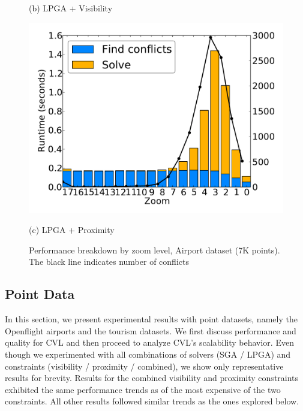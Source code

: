 \documentclass[11pt, oneside]{report}
\begin{document}
\begin{figure}[tb]
\begin{minipage}{0.329\linewidth}
    \centerline{(b) LPGA + Visibility}
  \end{minipage} \hfill
  \begin{minipage}{0.329\linewidth}
    \centerline{\includegraphics[width=0.9\linewidth]{./figs-cvl/prelim_pnt_7k_airports_lp_B.pdf}}
    \centerline{(c) LPGA + Proximity}
  \end{minipage}
  \caption{Performance breakdown by zoom level, Airport dataset (7K points). The black line indicates number of conflicts} \label{fig:performance:airport}
\end{figure}

\subsection{Point Data}
\label{sec:exp:points}

In this section, we present experimental results with point datasets, namely the Openflight airports and the tourism datasets. We first discuss performance and quality for CVL and then proceed to analyze CVL's scalability behavior. Even though we experimented with all combinations of solvers (SGA / LPGA) and constraints (visibility / proximity / combined), we show only representative results for brevity. Results for the combined visibility and proximity constraints exhibited the same performance trends as of the most expensive of the two constraints. All other results followed similar trends as the ones explored below.
\end{document}
